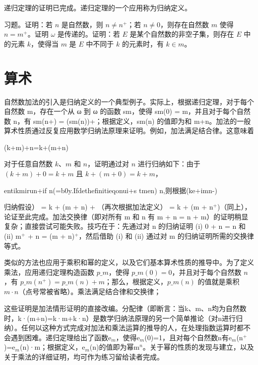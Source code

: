 \documentclass[12pt,a4paper]{ctexbook}
\theoremstyle{definition}
\theoremstyle{remark}
\begin{document}
{递归定理的证明已完成。递归定理的一个应用称为归纳定义。

习题。证明：若 \( n \) 是自然数，则 \( n \neq n^+ \)；若 \( n \neq 0 \)，则存在自然数 \( m \) 使得 \( n = m^+ \)。证明 \( \omega \) 是传递的。证明：若 \( E \) 是某个自然数的非空子集，则存在 \( E \) 中的元素 \( k \)，使得当 \( m \) 是 \( E \) 中不同于 \( k \) 的元素时，有 \( k \in m \)。


\chapter{算术}

自然数加法的引入是归纳定义的一个典型例子。实际上，根据递归定理，对于每个自然数 m，存在一个从 ω 到 ω 的函数 sm，使得 sm(0) = m，并且对于每个自然数 n，有 sm(n+) = (sm(n))+；根据定义，sm(n) 的值即为和 m+n。加法的一般算术性质通过反复应用数学归纳法原理来证明。例如，加法满足结合律。这意味着

(k+m)+n=k+(m+n)

对于任意自然数 \(k\)、\(m\) 和 \(n\)，证明通过对 \(n\) 进行归纳如下：由于 \((k + m) + 0 = k + m\) 且 \(k + (m + 0) = k + m\)，

entikmirun+if n(=b0y.Ifdethefinitieqonui+s tmen) n,则根据(ke+imn-)

归纳假设） = k + (m + n) + （再次根据加法定义） = k + (m + n$^{+}$)（同上），论证至此完成。加法交换律（即对所有 m 和 n 有 m + n = n + m）的证明稍显复杂；直接尝试可能失败。技巧在于：先通过对 n 的归纳证明 (i) 0 + n = n 和 (ii) m$^{+}$ + n = (m + n)$^{+}$，然后借助 (i) 和 (ii) 通过对 m 的归纳证明所需的交换律等式。

类似的方法也应用于乘积和幂的定义，以及它们基本算术性质的推导中。为了定义乘法，应用递归定理构造函数 \( p\_m \)，使得 \( p\_m(0) = 0 \)，并且对于每个自然数 \( n \)，有 \( p\_m(n^+) = p\_m(n) + m \)；那么，根据定义，\( p\_m(n) \) 的值就是乘积 \( m \cdot n \)（点号常被省略）。乘法满足结合律和交换律；

这些证明是加法情形证明的直接改编。分配律（即断言：当k、m、n均为自然数时，k·(m+n)=k·m+k·n）是数学归纳法原理的另一个简单推论（对n进行归纳）。任何以这种方式完成对加法和乘法运算的推导的人，在处理指数运算时都不会遇到困难。递归定理给出了函数e$_{m}$，使得e$_{m}$(0)=1，且对每个自然数n有e$_{m}$(n$^{+}$)=e$_{m}$(n)·m；根据定义，e$_{m}$(n)的值即为幂m$^{n}$。关于幂的性质的发现与建立，以及关于乘法的详细证明，均可作为练习留给读者完成。

}
\end{document}
